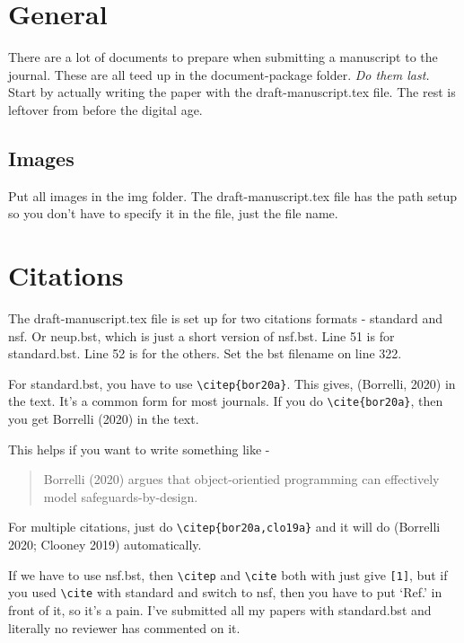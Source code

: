 \documentclass[11pt,a4paper]{article}
\begin{document}
\section*{General}
There are a lot of documents to prepare when submitting a manuscript to the journal. These are all teed up in the document-package folder. \textit{Do them last.} Start by actually writing the paper with the draft-manuscript.tex file. The rest is leftover from before the digital age.

\subsection*{Images}
Put all images in the img folder. The draft-manuscript.tex file has the path setup so you don't have to specify it in the file, just the file name.

\section*{Citations}
The draft-manuscript.tex file is set up for two citations formats - standard and nsf. Or neup.bst, which is just a short version of nsf.bst. Line 51 is for standard.bst. Line 52 is for the others. Set the bst filename on line 322.

For standard.bst, you have to use \verb=\citep{bor20a}=. This gives, (Borrelli, 2020) in the text. It's a common form for most journals. If you do \verb=\cite{bor20a}=, then you get Borrelli (2020) in the text. 

This helps if you want to write something like - 
\begin{quote}
    Borrelli (2020) argues that object-orientied programming can effectively model safeguards-by-design.
\end{quote}

For multiple citations, just do \verb=\citep{bor20a,clo19a}= and it will do (Borrelli 2020; Clooney 2019) automatically. 

If we have to use nsf.bst, then \verb=\citep= and \verb=\cite= both with just give \texttt{[1]}, but if you used \verb=\cite= with standard and switch to nsf, then you have to put `Ref.' in front of it, so it's a pain. I've submitted all my papers with standard.bst and literally no reviewer has commented on it.
\end{document}
